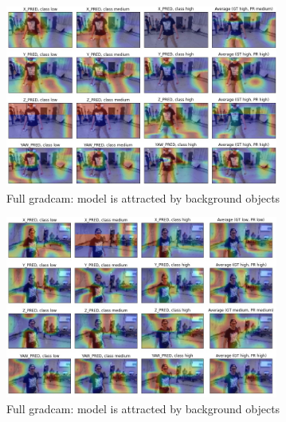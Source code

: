 \begin{figure}[!h]
\centering
\includegraphics[width=0.8\textwidth]{"contents/images/gradcam/apx-gradcam-5"}
\caption[Full \gls{gradcam}: model is attracted by background objects]{Full \gls{gradcam}: model is attracted by background objects}
\label{fig:apx-gradcam-5}
\end{figure}

\begin{figure}[!h]
\centering
\includegraphics[width=0.8\textwidth]{"contents/images/gradcam/apx-gradcam-6"}
\caption[]{Full \gls{gradcam}: model is attracted by background objects}
\label{fig:apx-gradcam-6}
\end{figure}